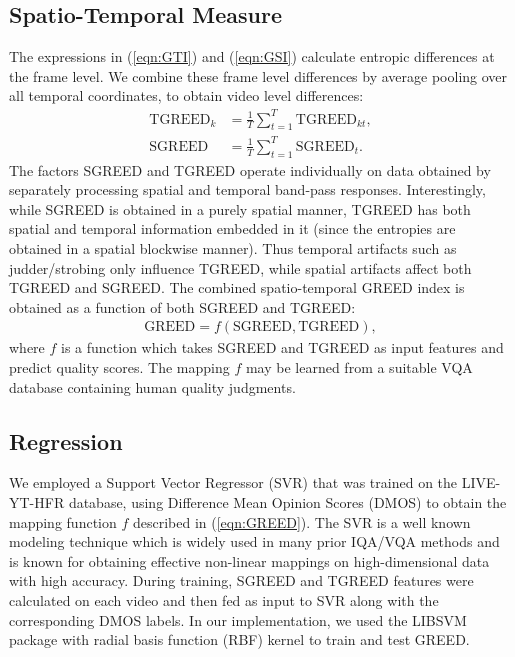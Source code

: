 \documentclass[journal]{IEEEtran}
\begin{document}
\subsection{Spatio-Temporal Measure}
The expressions in (\ref{eqn:GTI}) and (\ref{eqn:GSI}) calculate entropic differences at the frame level. We combine these frame level differences by average pooling over all temporal coordinates, to obtain video level differences:
\begin{align*}
    \text{TGREED}_k &= \frac{1}{T} \sum_{t = 1} ^T \text{TGREED}_{kt}, \\
    \text{SGREED} &= \frac{1}{T} \sum_{t = 1} ^T \text{SGREED}_{t}.
\end{align*}
The factors SGREED and TGREED operate individually on data obtained by separately processing spatial and temporal band-pass responses. Interestingly, while SGREED is obtained in a purely spatial manner, TGREED has both spatial and temporal information embedded in it (since the entropies are obtained in a spatial blockwise manner). Thus temporal artifacts such as judder/strobing only influence TGREED, while spatial artifacts affect both TGREED and SGREED. The combined spatio-temporal GREED index is obtained as a function of both SGREED and TGREED:
\begin{align}
    \text{GREED} = f(\text{SGREED},\text{TGREED}),
    \label{eqn:GREED}
\end{align}
where $f$ is a function which takes SGREED and TGREED as input features and predict quality scores. The mapping $f$ may be learned from a suitable VQA database containing human quality judgments. 

\subsection{Regression}
We employed a Support Vector Regressor (SVR) \cite{scholkopf2000new} that was trained on the LIVE-YT-HFR database, using Difference Mean Opinion Scores (DMOS) to obtain the mapping function $f$ described in (\ref{eqn:GREED}). The SVR is a well known modeling technique which is widely used in many prior IQA/VQA methods \cite{VMAF2016, bampis2018spatiotemporal, mittal2012no, saad2014blind} and is known for obtaining effective non-linear mappings on high-dimensional data with high accuracy. During training, SGREED and TGREED features were calculated on each video and then fed as input to SVR along with the corresponding DMOS labels. In our implementation, we used the LIBSVM \cite{chang2011libsvm} package with radial basis function (RBF) kernel to train and test GREED.
\end{document}
